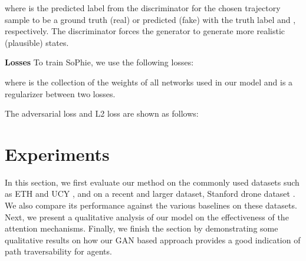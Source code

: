 \documentclass[10pt,twocolumn,letterpaper]{article}
\begin{document}
where  is the predicted label from the discriminator for the chosen trajectory sample to be a ground truth (real)  or predicted (fake)  with the truth label  and ,  respectively. The discriminator forces the generator to generate more realistic (plausible) states. 


\textbf{Losses}
To train SoPhie, we use the following losses:

where  is the collection of the weights of all networks used in our model and  is a regularizer between two losses. 

The adversarial loss  and L2 loss  are shown as follows:\\





\section{Experiments}
\label{sec:Experiments}

In this section, we first evaluate our method on the commonly used datasets such as ETH \cite{pellegrini2010improving} and UCY \cite{lerner2007crowds}, and on a recent and larger dataset, \ie Stanford drone dataset \cite{robicquet2016learning}. We also compare its performance against the various baselines on these datasets. Next, we present a qualitative analysis of our model on the effectiveness of the attention mechanisms. Finally, we finish the section by demonstrating some qualitative results on how our GAN based approach provides a good indication of path traversability for agents.
\end{document}
